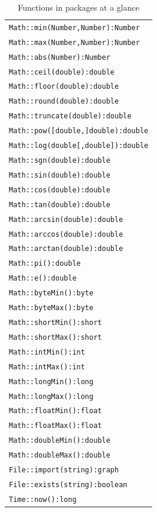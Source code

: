 \begin{table}[htbp]
\centering
\begin{tabular}{|l|}
\hline
\texttt{Math::min(Number,Number):Number}\\
\texttt{Math::max(Number,Number):Number}\\
\texttt{Math::abs(Number):Number}\\
\hline
\texttt{Math::ceil(double):double}\\
\texttt{Math::floor(double):double}\\
\texttt{Math::round(double):double}\\
\texttt{Math::truncate(double):double}\\
\hline
\texttt{Math::pow([double,]double):double}\\
\texttt{Math::log(double[,double]):double}\\
\texttt{Math::sgn(double):double}\\
\hline
\texttt{Math::sin(double):double}\\
\texttt{Math::cos(double):double}\\
\texttt{Math::tan(double):double}\\
\hline
\texttt{Math::arcsin(double):double}\\
\texttt{Math::arccos(double):double}\\
\texttt{Math::arctan(double):double}\\
\hline
\texttt{Math::pi():double}\\
\texttt{Math::e():double}\\
\hline
\texttt{Math::byteMin():byte}\\
\texttt{Math::byteMax():byte}\\
\texttt{Math::shortMin():short}\\
\texttt{Math::shortMax():short}\\
\texttt{Math::intMin():int}\\
\texttt{Math::intMax():int}\\
\texttt{Math::longMin():long}\\
\texttt{Math::longMax():long}\\
\texttt{Math::floatMin():float}\\
\texttt{Math::floatMax():float}\\
\texttt{Math::doubleMin():double}\\
\texttt{Math::doubleMax():double}\\
\hline
\texttt{File::import(string):graph}\\
\texttt{File::exists(string):boolean}\\
\hline
\texttt{Time::now():long}\\
\hline
\end{tabular}
\caption{Functions in packages at a glance}
\label{packagefuncstab}
\end{table}


